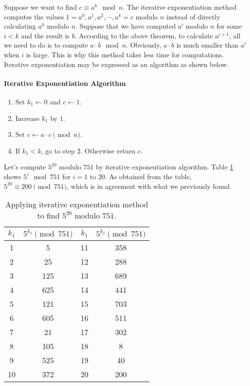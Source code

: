 \documentclass{subfile}
\begin{document}
	Suppose we want to find $c \equiv a^k \mod n$. The iterative exponentiation method computes the values $1=a^0, a^1, a^2, \cdots, a^k=c$ modulo $n$ instead of directly calculating $a^k$ modulo $n$. Suppose that we have computed $a^i$ modulo $n$ for some $i<k$ and the result is $b$. According to the above theorem, to calculate $a^{i+1}$, all we need to do is to compute $a\cdot b \mod n$. Obviously, $a \cdot b$ is much smaller than $a^i$ when $i$ is large. This is why this method takes less time for computations. Iterative exponentiation may be expressed as an algorithm as shown below.
	
	\paragraph{Iterative Exponentiation Algorithm}
	\begin{enumerate}[1.]
		\item Set $k_1 \longleftarrow 0$ and $c \longleftarrow 1$.
		\item Increase $k_1$ by $1$.
		\item Set $c \longleftarrow a \cdot c \pmod n$.
		\item If $k_1<k$, go to step $2$. Otherwise return $c$.
	\end{enumerate}
	
	\begin{example}
		Let's compute $5^{20}$ modulo $751$ by iterative exponentiation algorithm. Table \ref{table:modmult} shows $5^i \mod{751}$ for $i=1$ to $20$. As obtained from the table, $5^{20} \equiv 200 \pmod{751}$, which is in agreement with what we previously found.
		\begin{table}
			\centering
			\begin{tabular}{|c|c|c|c|} 
				\hline 
				$k_1$ & $5^{k_1} \pmod{751}$ & $k_1$ & $5^{k_1} \pmod{751}$ \\ 
				\hline 
				1 & 5 & 11 & 358  \\ 
				\hline 
				2 & 25 & 12 & 288 \\ 
				\hline 
				3 & 125 & 13 & 689 \\ 
				\hline 
				4 & 625 & 14 & 441  \\ 
				\hline 
				5 & 121 & 15 & 703 \\ 
				\hline 
				6 & 605 & 16 & 511 \\ 
				\hline 
				7 & 21 & 17 & 302 \\ 
				\hline 
				8 & 105 & 18 & 8 \\ 
				\hline 
				9 & 525 & 19 & 40 \\ 
				\hline 
				10 & 372 & 20 & 200 \\ 
				\hline 
			\end{tabular} 
			\caption{Applying iterative exponentiation method to find $5^{20}$ modulo $751$.}
			\label{table:modmult}
		\end{table}
	\end{example}
	
\end{document}
